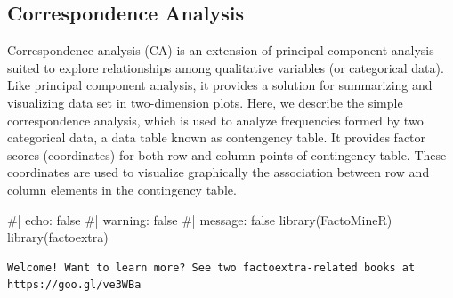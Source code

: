 \documentclass[
]{aft}
\newenvironment{Shaded}{\begin{snugshade}}{\end{snugshade}}
\newcommand{\AttributeTok}[1]{\textcolor[rgb]{0.40,0.45,0.13}{#1}}
\newcommand{\CommentTok}[1]{\textcolor[rgb]{0.37,0.37,0.37}{#1}}
\newcommand{\ConstantTok}[1]{\textcolor[rgb]{0.56,0.35,0.01}{#1}}
\newcommand{\FunctionTok}[1]{\textcolor[rgb]{0.28,0.35,0.67}{#1}}
\newcommand{\NormalTok}[1]{\textcolor[rgb]{0.00,0.23,0.31}{#1}}
\newcommand{\OtherTok}[1]{\textcolor[rgb]{0.00,0.23,0.31}{#1}}
\newcommand{\SpecialCharTok}[1]{\textcolor[rgb]{0.37,0.37,0.37}{#1}}
\newcommand{\StringTok}[1]{\textcolor[rgb]{0.13,0.47,0.30}{#1}}
\begin{document}
\hypertarget{correspondence-analysis}{%
\subsection{Correspondence Analysis}\label{correspondence-analysis}}

Correspondence analysis (CA) is an extension of principal component
analysis suited to explore relationships among qualitative variables (or
categorical data). Like principal component analysis, it provides a
solution for summarizing and visualizing data set in two-dimension
plots. Here, we describe the simple correspondence analysis, which is
used to analyze frequencies formed by two categorical data, a data table
known as contengency table. It provides factor scores (coordinates) for
both row and column points of contingency table. These coordinates are
used to visualize graphically the association between row and column
elements in the contingency table.

\begin{Shaded}
\begin{Highlighting}[]
\CommentTok{\#| echo: false}
\CommentTok{\#| warning: false}
\CommentTok{\#| message: false}
\FunctionTok{library}\NormalTok{(FactoMineR)}
\FunctionTok{library}\NormalTok{(factoextra)}
\end{Highlighting}
\end{Shaded}

\begin{verbatim}
Welcome! Want to learn more? See two factoextra-related books at https://goo.gl/ve3WBa
\end{verbatim}

\begin{Shaded}
\end{Shaded}
\end{document}
